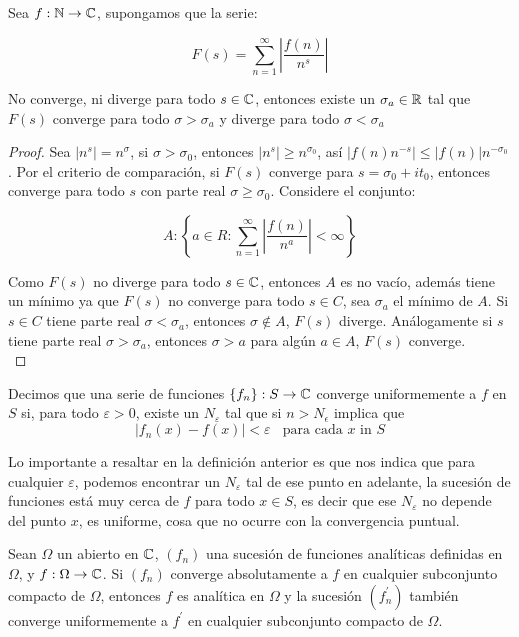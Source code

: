 \begin{theorem}
Sea $f:\mathbb{N} \to \mathbb{C}$, supongamos que la serie:

$$F(s)=\sum_{n=1}^{\infty} \left| \frac{f(n)}{n^s}\right|$$

No converge, ni diverge para  todo $s\in \mathbb{C}$, entonces existe un $\sigma_a\in \mathbb{R}$ tal que $F(s)$ converge para todo $\sigma>\sigma_a$ y diverge para todo $\sigma<\sigma_a$
\end{theorem}

\begin{proof}
Sea $|n^s|=n^{\sigma}$, si $\sigma>\sigma_0$, entonces $|n^s|\geq n^{\sigma_0}$, así $|f(n)n^{-s}|\leq|f(n)|n^{-\sigma_0}$. Por el criterio de comparación, si $F(s)$ converge para $s=\sigma_0+i t_0$, entonces converge para todo $s$ con parte real $\sigma\geq\sigma_0$. Considere el conjunto:

$$A:\left\{a\in R : \sum_{n=1}^{\infty} \left|\frac{f(n)}{n^a}\right|<\infty\right\}$$

Como $F(s)$ no diverge para  todo $s\in\mathbb{C} $, entonces $A$ es no vacío, además tiene un mínimo ya que $F(s)$ no converge  para todo $s\in C$, sea $\sigma_a$ el mínimo de $A$. Si $s\in C$ tiene parte real $\sigma< \sigma_a$, entonces $\sigma\not\in A$, $F(s)$ diverge. Análogamente si $s$ tiene parte real $\sigma>\sigma_a$, entonces $\sigma>a$ para algún $a\in A$, $F(s)$ converge.\\
\end{proof}


\begin{definition}
Decimos que una serie de funciones $\{f_n\}:S\to \mathbb{C}$ converge uniformemente a $f$ en $S$ si, para todo $\varepsilon>0$, existe un $N_\varepsilon$ tal que si $n>N_\epsilon$ implica que
    $$|f_n(x)-f(x)|<\varepsilon\ \ \ \ \text{para cada $x$ in $S$}$$
\end{definition}

Lo importante a resaltar en la definición anterior es  que nos indica que para cualquier $\varepsilon$, podemos encontrar un $N_\varepsilon$ tal de ese punto en adelante, la sucesión de funciones está muy cerca de $f$ para todo $x\in S$, es decir que ese $N_\varepsilon$ no depende del punto $x$, es uniforme, cosa que no ocurre con la convergencia puntual.

\begin{theorem}
Sean $\Omega$ un abierto en $\mathbb{C}$, $(f_n)$ una sucesión de funciones analíticas definidas en $\Omega$, y $f:\Omega\to\mathbb{C}$. Si $(f_n)$ converge absolutamente a $f$ en cualquier subconjunto compacto de $\Omega$, entonces $f$ es analítica en $\Omega$ y la sucesión $(f_n^{\prime})$ también converge uniformemente a $f^{\prime}$ en cualquier subconjunto compacto de $\Omega$.
\end{theorem}

